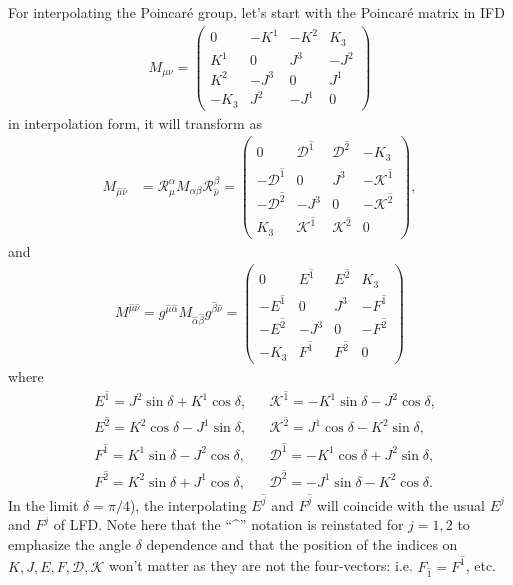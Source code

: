 \documentclass[%
 reprint,
superscriptaddress,
 amsmath,amssymb,
 aps,
]{revtex4-2}
\newcommand{\muT}{\hat{\mu}}
\newcommand{\nuT}{\hat{\nu}}
\newcommand{\itP}[1]{\hat{#1}}
\begin{document}
For interpolating the Poincar\'e group, let's start with the Poincar\'e matrix in IFD
\begin{align}\label{eqn:J_mu_nu_IF}
  M_{\mu\nu}=\begin{pmatrix}
     0&-K^1&-K^2&K_3\\
     K^1&0&J^3&-J^2\\
     K^2&-J^3&0&J^1\\
     -K_3&J^2&-J^1&0
     \end{pmatrix}
\end{align}
in interpolation form, it will transform as
\begin{align}\label{eqn:Poincare_Matrix_Interpolation_superscripts}
  M_{\muT\nuT}
  &=\mathcal{R}_{\hat{\mu}}^{{\alpha}}M_{\alpha\beta}\mathcal{R}_{\hat{\nu}}^{{\beta}}=\begin{pmatrix}
    0 & {\mathcal{D}}^{\itP{1}} & {\mathcal{D}}^{\itP{2}} & -K_3\\
    -{\mathcal{D}}^{\itP{1}} & 0 & {J}^{3} & -{\mathcal{K}}^{\itP{1}}\\
    -{\mathcal{D}}^{\itP{2}} & -{J}^{3} & 0 & -{\mathcal{K}}^{\itP{2}}\\
    K_3 & {\mathcal{K}}^{\itP{1}} & {\mathcal{K}}^{\itP{2}} & 0
  \end{pmatrix},
\end{align}
and
\begin{align}
  M^{\muT\nuT}
  =
  g^{\muT\itP{\alpha}}M_{\itP{\alpha}\itP{\beta}}g^{\itP{\beta}\nuT}
  =
  \begin{pmatrix}
    0 & {E}^{\itP{1}} & {E}^{\itP{2}} & K_3\\
    -{E}^{\itP{1}} & 0 & {J}^{3} & -{F}^{\itP{1}}\\
    -{E}^{\itP{2}} & -{J}^{3} & 0 & -{F}^{\itP{2}}\\
    -K_3 & {F}^{\itP{1}} & {F}^{\itP{2}} & 0
  \end{pmatrix}
\end{align}
where
\begin{align}\label{eqn:E_F_D_K_Definition_Interpolation_Angle}
  &E^{\itP{1}}=J^{2}\sin\delta+K^{1}\cos\delta,
  &&\mathcal{K}^{\itP{1}}=-K^{1}\sin\delta-J^{2}\cos\delta, \nonumber\\
  &E^{\itP{2}}=K^{2}\cos\delta-J^{1}\sin\delta,
  &&\mathcal{K}^{\itP{2}}=J^{1}\cos\delta-K^{2}\sin\delta, \nonumber\\
  &F^{\itP{1}}=K^{1}\sin\delta-J^{2}\cos\delta,
  &&\mathcal{D}^{\itP{1}}=-K^{1}\cos\delta+J^{2}\sin\delta, \nonumber\\
  &F^{\itP{2}}=K^{2}\sin\delta+J^{1}\cos\delta,
  &&\mathcal{D}^{\itP{2}}=-J^{1}\sin\delta-K^{2}\cos\delta.
\end{align}
In the limit $\delta=\pi/4$), the interpolating $E^{\itP{j}}$ and $F^{\itP{j}}$ will coincide with the usual $E^{j}$ and $F^{j}$ of LFD.
Note here that the ``\textasciicircum'' notation is reinstated for $j=1, 2$ to emphasize the angle $\delta$ dependence and that the position of the indices on $K, J, E, F, \mathcal{D}, \mathcal{K}$ won't matter as they are not the four-vectors: i.e. $F_{\itP{1}}=F^{\itP{1}}$, etc.
\end{document}
